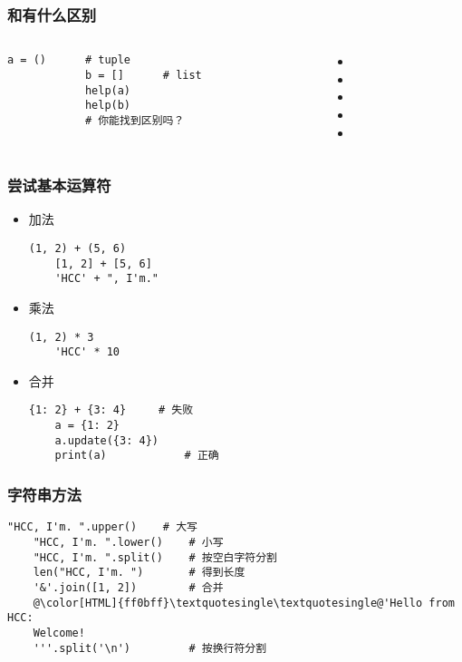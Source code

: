 \begin{CJK}{UTF8}{gbsn}
\begin{frame} [fragile]
	\frametitle{和有什么区别}
	\linespread{1.5}
	\begin{columns}[T]
		\begin{column}[T]{.5\textwidth}
			\begin{lstlisting}[style=pythonstyle, gobble=12, texcl]
			a = ()		# tuple
			b = []		# list
			help(a)
			help(b)
			# 你能找到区别吗？
			\end{lstlisting}
		\end{column}
		\begin{column}[T]{.5\textwidth}
			\begin{itemize}
			\item {}
			\item {}
			\item {}
			\item {}
			\item {}
			\end{itemize}
		\end{column}
	\end{columns}
\end{frame}

\begin{frame} [fragile]
	\frametitle{尝试基本运算符}
	\begin{itemize}
	\item 加法
	\begin{lstlisting}[style=pythonstyle, gobble=4, texcl]
	(1, 2) + (5, 6)
	[1, 2] + [5, 6]
	'HCC' + ", I'm."
	\end{lstlisting}
	\item 乘法
	\begin{lstlisting}[style=pythonstyle, gobble=4, texcl]
	(1, 2) * 3
	'HCC' * 10
	\end{lstlisting}
	\item 合并
	\begin{lstlisting}[style=pythonstyle, gobble=4, texcl]
	{1: 2} + {3: 4}		# 失败
	a = {1: 2}
	a.update({3: 4})
	print(a)			# 正确
	\end{lstlisting}
	\end{itemize}
\end{frame}

\begin{frame} [fragile]
	\frametitle{字符串方法}
	\linespread{1.5}
	\begin{lstlisting}[style=pythonstyle, gobble=4, texcl, escapechar=@]
	"HCC, I'm. ".upper()	# 大写
	"HCC, I'm. ".lower()	# 小写
	"HCC, I'm. ".split()	# 按空白字符分割
	len("HCC, I'm. ")		# 得到长度
	'&'.join([1, 2])		# 合并
	@\color[HTML]{ff0bff}\textquotesingle\textquotesingle@'Hello from HCC:
	Welcome!
	'''.split('\n')			# 按换行符分割
	\end{lstlisting}
\end{frame}


\end{CJK}
